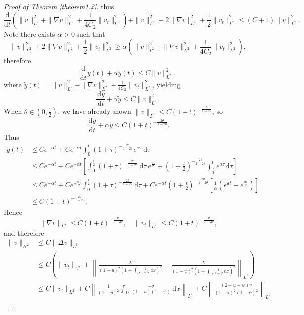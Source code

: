 \documentclass[10pt,a4paper]{amsart}
\begin{document}
\begin{proof}[Proof of Theorem \ref{theorem1.2}]
thus
$$\frac{\mathrm{d}}{\mathrm{d}t}\left(\|v\|_{L^2}^2+\|\nabla v\|_{L^2}^2+\frac{1}{4C_2}\|v_t\|_{L^2}^2\right)+\|v\|_{L^2}^{2}+2\|\nabla v\|_{L^2}^2+\frac{1}{2}\|v_t\|_{L^2}^2\le (C+1)\|v\|_{L^2}^{2}.$$
Note there exists $\alpha>0$ such that
$$\|v\|_{L^2}^{2}+2\|\nabla v\|_{L^2}^2+\frac{1}{2}\|v_t\|_{L^2}^2\ge \alpha\left(\|v\|_{L^2}^2+\|\nabla v\|_{L^2}^2+\frac{1}{4C_2}\|v_t\|_{L^2}^2\right),$$
therefore
$$\frac{\mathrm{d}}{\mathrm{d}t}\widetilde{y}(t)+\alpha\widetilde{y}(t)\le C\|v\|_{L^2}^{2},$$
where $\widetilde{y}(t)=\|v\|_{L^2}^2+\|\nabla v\|_{L^2}^2+\frac{1}{4C_2}\|v_t\|_{L^2}^2$, yielding
\begin{equation}
    \frac{\,\mathrm{d}\widetilde{y}}{\,\mathrm{d}t}+\alpha\widetilde{y}\le C\|v\|_{L^2}^{2}.\label{4.6}
\end{equation}
When $\theta\in (0,\frac{1}{2})$, we have already shown $\|v\|_{L^2}\le C(1+t)^{-\frac{\theta}{1-2\theta}}$, so
$$\frac{\,\mathrm{d}\widetilde{y}}{\,\mathrm{d}t}+\alpha\widetilde{y}\le C(1+t)^{-\frac{2\theta}{1-2\theta}}.$$
Thus
\begin{align*}
    \widetilde{y}(t)&\le Ce^{-\alpha t}+Ce^{-\alpha t}\int_{0}^{t}(1+\tau)^{-\frac{2\theta}{1-2\theta}}e^{\alpha \tau}\,\mathrm{d}\tau\\
    &\le Ce^{-\alpha t}+Ce^{-\alpha t}\left[\int_{0}^{\frac{t}{2}}(1+\tau)^{-\frac{2\theta}{1-2\theta}}\,\mathrm{d}\tau\ e^{\frac{\alpha t}{2}}+(1+\frac{t}{2})^{-\frac{2\theta}{1-2\theta}}\int_{\frac{t}{2}}^{t}e^{\alpha\tau}\,\mathrm{d}\tau\right]\\
    &\le Ce^{-\alpha t}+Ce^{-\frac{\alpha t}{2}}\int_{0}^{\frac{t}{2}}(1+\tau)^{-\frac{2\theta}{1-2\theta}}\,\mathrm{d}\tau +Ce^{-\alpha t}(1+\frac{t}{2})^{-\frac{2\theta}{1-2\theta}}\left[\frac{1}{\alpha}(e^{\alpha t}-e^{\frac{\alpha t}{2}})\right]\\
    &\le C(1+t)^{-\frac{2\theta}{1-2\theta}}.
\end{align*}
Hence
$$\|\nabla v\|_{L^2}\le C(1+t)^{-\frac{\theta}{1-2\theta}},\quad \|v_t\|_{L^2}\le C(1+t)^{-\frac{\theta}{1-2\theta}},$$
and therefore
\begin{align*}
    \|v\|_{H^2}&\le C\|\Delta v\|_{L^2}\\
    &\le C\left(\|v_t\|_{L^2}+\left\|\frac{\lambda}{(1-u)^2(1+\int_{\Omega}\frac{1}{1-u}\,\mathrm{d}x)^2}-\frac{\lambda}{(1-\psi)^2(1+\int_{\Omega}\frac{1}{1-\psi}\,\mathrm{d}x)^2}\right\|_{L^2}\right)\\
    &\le C\|v_t\|_{L^2}+C\left\|\frac{1}{(1-u)^2}\int_{\Omega}\frac{-v}{(1-u)(1-\psi)}\,\mathrm{d}x\right\|_{L^2}+C\left\|\frac{(2-u-\psi)v}{(1-u)^2(1-\psi)^2}\right\|_{L^2}\\

\end{align*}
\end{proof}
\end{document}
